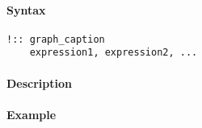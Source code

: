 


	\paragraph{Syntax}\label{syntax}

\begin{verbatim}
!:: graph_caption
    expression1, expression2, ...
\end{verbatim}

\paragraph{Description}\label{description}

\paragraph{Example}\label{example}


